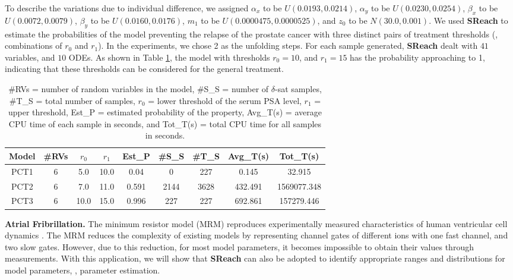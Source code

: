 To describe the variations due to individual difference, we assigned $\alpha_x$ to be $U(0.0193, 0.0214)$, $\alpha_y$ to be $U(0.0230, 0.0254)$, $\beta_x$ to be $U(0.0072, 0.0079)$, $\beta_y$ to be $U(0.0160, 0.0176)$, $m_1$ to be $U(0.0000475, 0.0000525) $, and $z_0$ to be $N(30.0, 0.001)$. 
We used {\bf SReach} to estimate the probabilities of the model preventing the relapse of the prostate cancer with three distinct pairs of treatment thresholds (\ie, combinations of $r_0$ and $r_1$).  In the experiments, we chose 2 as the unfolding steps. For each sample generated, {\bf SReach} dealt with $41$ variables, and $10$ ODEs. As shown in Table \ref{table:prostate}, the model with thresholds $r_0 = 10$, and $r_1 = 15$ has the probability approaching to 1, indicating that these thresholds can be considered for the general treatment. 
\vspace{-.5cm}
\begin{table}[th!]
\captionsetup{font=scriptsize}
\centering
    \begin{tabular}{c|c|c|c|c|c|c|c|c}
    \hline
    Model & \#RVs & $r_0$ & $r_1$ & Est\_P & \#S\_S & \#T\_S & Avg\_T(s) & Tot\_T(s) \\ \hline
    PCT1  & 6     & 5.0  & 10.0 & 0.04   & 0      & 227    & 0.145   & 32.915     \\ \hline
    PCT2  & 6     & 7.0  & 11.0 & 0.591  & 2144   & 3628   & 432.491 & 1569077.348     \\ \hline
    PCT3  & 6     & 10.0 & 15.0 & 0.996  & 227    & 227    & 692.861   & 157279.446   \\ \hline
    \end{tabular}
    \caption{\#RVs = number of random variables in the model, \#S\_S = number of $\delta$-sat samples, 
\#T\_S = total number of samples, $r_0$ = lower threshold of the serum PSA level, $r_1$ = upper threshold, 
Est\_P = estimated probability of the property,  Avg\_T(s) = average CPU time of each sample in seconds, and Tot\_T(s) = total CPU time for all samples in seconds.}
    \label{table:prostate}
\end{table}\vspace{-1cm}

{\bf\noindent Atrial Fribrillation.} The minimum resistor model (MRM) reproduces experimentally measured characteristics 
of human ventricular cell dynamics \cite{bueno2008minimal}. 
The MRM reduces the complexity of existing models by representing channel gates of different ions with one fast channel, and two slow gates. However, due to this reduction, for most model parameters, it becomes impossible to obtain their values through measurements. With this application, we will show that {\bf SReach} can also be adopted to identify appropriate ranges and distributions for model parameters, \ie, parameter estimation.

